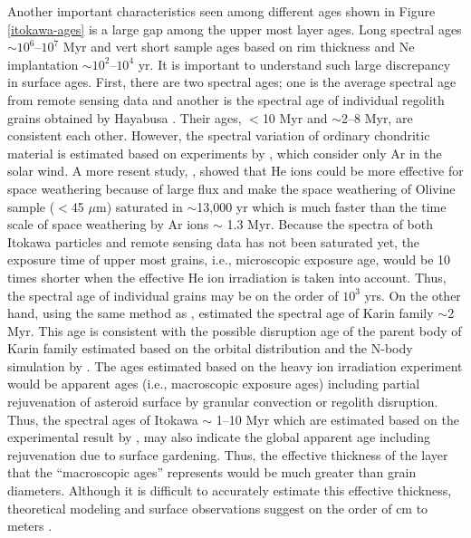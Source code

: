 \documentclass[3p,authoryear]{elsarticle}
\begin{document}
Another important characteristics seen among different ages shown in Figure \ref{itokawa-ages} is a large gap among the upper most layer ages. Long spectral ages $\sim 10^6$--$10^7$ Myr and vert short sample ages based on rim thickness and Ne implantation $\sim 10^2$--$10^4$ yr. It is important to understand such large discrepancy in surface ages. First, there are two spectral ages; one is the average spectral age from remote sensing data \citep{koga2014} and another is the spectral age of individual regolith grains obtained by Hayabusa \citep{bonal2015}. Their ages, $<$10 Myr and $\sim$2--8 Myr, are consistent each other.
 However, the spectral variation of ordinary chondritic material is estimated based on experiments by \citet{strazzulla2005}, which consider only Ar in the solar wind. A more resent study, \citet{loeffler2009}, showed that He ions could be more effective for space weathering because of large flux and make the space weathering of Olivine sample ($<$45 $\mu$m) saturated in $\sim$13,000 yr which is much faster than the time scale of space weathering by Ar ions $\sim$ 1.3 Myr. Because the spectra of both Itokawa particles and remote sensing data has not been saturated yet, the exposure time of upper most grains, i.e., microscopic exposure age, would be 10 times shorter when the effective He ion irradiation is taken into account. Thus, the spectral age of individual grains may be on the order of $10^3$ yrs. On the other hand, using the same method as \citet{bonal2015}, \citet{brunetto2006b} estimated the spectral age of Karin family $\sim$2 Myr. This age is consistent with the possible disruption age of the parent body of Karin family estimated based on the orbital distribution and the N-body simulation by \citet{nesvorny2002}. The ages estimated based on the heavy ion irradiation experiment \citep{strazzulla2005} would be apparent ages (i.e., macroscopic exposure ages) including partial rejuvenation of asteroid surface by granular convection or regolith disruption. Thus, the spectral ages of Itokawa $\sim$ 1--10 Myr \citep{koga2014,bonal2015} which are estimated based on the experimental result by \citet{strazzulla2005}, may also indicate the global apparent age including rejuvenation due to surface gardening. Thus, the effective thickness of the layer that the ``macroscopic ages'' represents would be much greater than grain diameters. Although it is difficult to accurately estimate this effective thickness, theoretical modeling and surface observations suggest on the order of cm to meters \citep{tancredi2012, yamada2016}.
\end{document}
